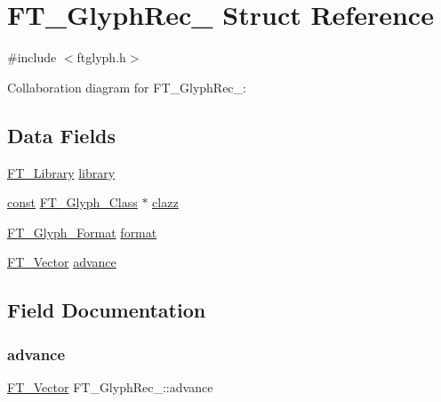 \hypertarget{struct_f_t___glyph_rec__}{}\section{F\+T\+\_\+\+Glyph\+Rec\+\_\+ Struct Reference}
\label{struct_f_t___glyph_rec__}


{\ttfamily \#include $<$ftglyph.\+h$>$}



Collaboration diagram for F\+T\+\_\+\+Glyph\+Rec\+\_\+\+:
\subsection*{Data Fields}
\begin{DoxyCompactItemize}
\item 
\hyperlink{freetype_8h_a92857f8bf079b7b9ef5d3ce74cf89ef5}{F\+T\+\_\+\+Library} \hyperlink{struct_f_t___glyph_rec___a00679b5e2519affab0f3999718817f8e}{library}
\item 
\hyperlink{zconf_8h_a2c212835823e3c54a8ab6d95c652660e}{const} \hyperlink{ftglyph_8h_ad05b3999d93247f41f1c4ac20ea0104b}{F\+T\+\_\+\+Glyph\+\_\+\+Class} $\ast$ \hyperlink{struct_f_t___glyph_rec___ad7074cfe0e9fd6616e4dc4011e481524}{clazz}
\item 
\hyperlink{ftimage_8h_aeca0d10a27aedecbf96515e0628aff1f}{F\+T\+\_\+\+Glyph\+\_\+\+Format} \hyperlink{struct_f_t___glyph_rec___a26b42a2610a69dcaed3e7c8b6d506211}{format}
\item 
\hyperlink{ftimage_8h_ab158b5a7e422acb1968af95db786d018}{F\+T\+\_\+\+Vector} \hyperlink{struct_f_t___glyph_rec___afd95b047df6a249db79018a279137018}{advance}
\end{DoxyCompactItemize}


\subsection{Field Documentation}
\mbox{\label{struct_f_t___glyph_rec___afd95b047df6a249db79018a279137018}} 
\subsubsection{\texorpdfstring{advance}{advance}}
{\footnotesize\ttfamily \hyperlink{ftimage_8h_ab158b5a7e422acb1968af95db786d018}{F\+T\+\_\+\+Vector} F\+T\+\_\+\+Glyph\+Rec\+\_\+\+::advance}

